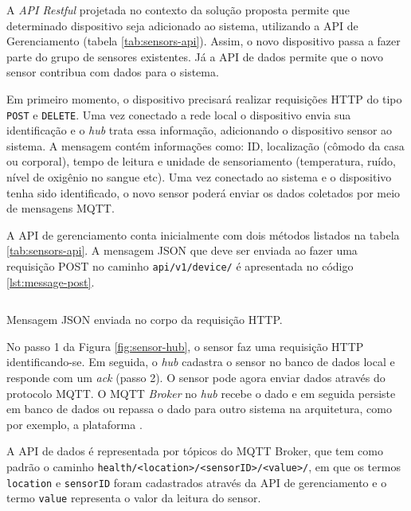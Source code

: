 A \textit{API Restful} projetada no contexto da solução proposta permite que determinado
dispositivo seja adicionado ao sistema, utilizando a API de Gerenciamento (tabela
\ref{tab:sensors-api}). 
Assim, o novo dispositivo passa a fazer parte do grupo de sensores existentes.
Já a API de dados permite que o novo sensor contribua com dados para o sistema.


Em primeiro momento, o dispositivo precisará realizar requisições HTTP do tipo
\texttt{POST} e \texttt{DELETE}. Uma vez conectado a rede local o dispositivo envia sua
identificação e o \textit{hub} trata essa informação, adicionando o dispositivo
sensor ao sistema. A mensagem contém informações como: ID, localização (cômodo da casa
ou corporal), tempo de leitura e unidade de sensoriamento (temperatura, ruído,
nível de oxigênio no sangue etc). Uma vez conectado ao sistema e o dispositivo
tenha sido identificado, o novo sensor poderá enviar os dados coletados por meio de
mensagens MQTT. 

A API de gerenciamento conta inicialmente com dois métodos listados na tabela
\ref{tab:sensors-api}. A mensagem JSON que deve ser enviada ao fazer uma
requisição POST no caminho \texttt{api/v1/device/} é apresentada no código
\ref{lst:message-post}.

\begin{listing}[ht!]
\inputminted{json}{codigos/message-post.json}
\caption{Mensagem JSON enviada no corpo da requisição HTTP.}
\label{lst:message-post}
\end{listing}

No passo 1 da Figura \ref{fig:sensor-hub}, o sensor faz uma requisição HTTP
identificando-se. Em seguida, o \textit{hub} cadastra o sensor no banco de dados
local e responde com um \textit{ack} (passo 2). O sensor pode agora enviar
dados através do protocolo MQTT. O MQTT \textit{Broker} no \textit{hub} recebe
o dado e em seguida persiste em banco de dados ou repassa o dado para outro
sistema na arquitetura, como por exemplo, a plataforma \nextsaude.


A API de dados é representada por tópicos do MQTT Broker, que tem como padrão
o caminho \texttt{health/<location>/<sensorID>/<value>/}, em que os termos 
\texttt{location} e \texttt{sensorID} foram cadastrados através da API de
gerenciamento e o termo \texttt{value} representa o valor da leitura do sensor.

